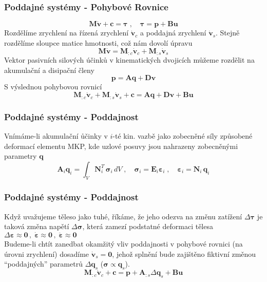 	\begin{frame}
		\frametitle{Poddajné systémy - Pohybové Rovnice}

		\begin{equation*}
			\bm{M}\bm{\dot{v}} + \bm{c} = \bm{\tau}
			\;,\quad 
			\bm{\tau} = \bm{p} + \bm{B}\bm{u}
		\end{equation*}
		Rozdělíme zrychlení na řízená zrychlení $\bm{\dot{v}}_c$ a poddajná zrychlení $\bm{\dot{v}}_s$. Stejně rozdělíme sloupce matice hmotnosti, což nám dovolí úpravu
		\begin{equation*}
			\bm{M}\bm{\dot{v}} = \bm{M}_{:c} \bm{\dot{v}}_c + \bm{M}_{:s} \bm{\dot{v}}_s
		\end{equation*}
		Vektor pasivních silových účinků v kinematických dvojicích můžeme rozdělit na akumulační a disipační členy
		\begin{equation*}
			\bm{p} = \bm{A}\bm{q} + \bm{D}\bm{v}
		\end{equation*}
		S výslednou pohybovou rovnicí
		\begin{equation*}
			\bm{M}_{:c} \bm{\dot{v}}_c + \bm{M}_{:s} \bm{\dot{v}}_s + \bm{c} = \bm{A}\bm{q} + \bm{D}\bm{v} + \bm{B}\bm{u}
		\end{equation*}
	\end{frame}

	\begin{frame}
		\frametitle{Poddajné systémy - Poddajnost}
		Vnímáme-li akumulační ůčinky v $i$-té kin. vazbě jako zobecněné síly způsobené deformací elementu MKP, kde uzlové posuvy jsou nahrazeny zobecněnými parametry $\bm{q}$
		\begin{equation*}
			\bm{A}_i\bm{q}_i
			=
			\int_{V} \bm{N}_i^T  \, \bm{\sigma}_i \, dV
			\;,\quad 
			\bm{\sigma}_i = \bm{E}_i \bm{\varepsilon}_i
			\;,\quad 
			\bm{\varepsilon}_i = \bm{N}_i \, \bm{q}_i 
		\end{equation*}
	\end{frame}

	\begin{frame}
		\frametitle{Poddajné systémy - Poddajnost}
		Když uvažujeme těleso jako tuhé, říkáme, že jeho odezva na změnu zatížení $\Delta\bm{\tau}$ je taková změna napětí $\Delta\bm{\sigma}$, která zamezí podstatné deformaci tělesa $\Delta\bm{\varepsilon} \approx \bm{0} \,,\; \bm{\dot{\varepsilon}} \approx \bm{0} \,,\; \bm{\ddot{\varepsilon}} \approx \bm{0}$
		\\\vspace{1em}
		Budeme-li chtít zanedbat okamžitý vliv poddajnosti v pohybové rovnici (na úrovni zrychlení) dosadíme $\bm{\dot{v}}_s = \bm{0}$, jehož splnění bude zajištěno fiktivní změnou ``poddajných'' parametrů $\Delta\bm{q}_s$ ($\bm{\sigma} \propto \bm{q}_s$).
		\begin{equation*}
			\bm{M}_{:c} \bm{\dot{v}}_c + \bm{c} = \bm{p} + \bm{A}_{:s} \Delta\bm{q}_s + \bm{B}\bm{u}
		\end{equation*}
	\end{frame}

